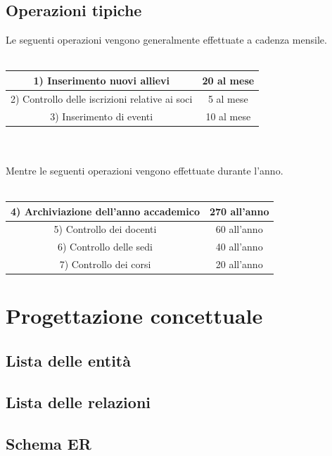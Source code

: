 \documentclass[12pt]{article}
\begin{document}
	\subsection{Operazioni tipiche}
		Le seguenti operazioni vengono generalmente effettuate a cadenza mensile.\\\\
		\vline
		\begin{tabular}{c|c}
			\hline
			1) Inserimento nuovi allievi & 20 al mese\\
			\hline
			2) Controllo delle iscrizioni relative ai soci & 5 al mese\\
			\hline
			3) Inserimento di eventi & 10 al mese\\
			\hline
		\end{tabular}
		\vline \\\\
		Mentre le seguenti operazioni vengono effettuate durante l'anno.\\\\
		\vline
		\begin{tabular}{c|c}
			\hline
			4) Archiviazione dell'anno accademico & 270 all'anno\\
			\hline
			5) Controllo dei docenti & 60 all'anno\\
			\hline
			6) Controllo delle sedi & 40 all'anno\\
			\hline
			7) Controllo dei corsi & 20 all'anno\\
			\hline
		\end{tabular}
		\vline
\section{Progettazione concettuale}
	\subsection{Lista delle entità}
	\subsection{Lista delle relazioni}
	\subsection{Schema ER}
\end{document}
